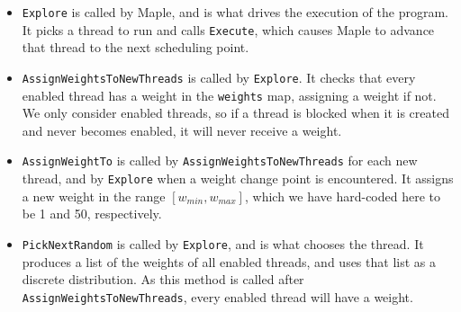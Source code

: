 \begin{itemize}
\item \verb|Explore| is called by Maple, and is what drives the
  execution of the program.  It picks a thread to run and calls
  \verb|Execute|, which causes Maple to advance that thread to the
  next scheduling point.

\item \verb|AssignWeightsToNewThreads| is called by \verb|Explore|.
  It checks that every enabled thread has a weight in the
  \verb|weights| map, assigning a weight if not.  We only consider
  enabled threads, so if a thread is blocked when it is created and
  never becomes enabled, it will never receive a weight.

\item \verb|AssignWeightTo| is called by
  \verb|AssignWeightsToNewThreads| for each new thread, and by
  \verb|Explore| when a weight change point is encountered.  It
  assigns a new weight in the range $[w_{min}, w_{max}]$, which we
  have hard-coded here to be 1 and 50, respectively.

\item \verb|PickNextRandom| is called by \verb|Explore|, and is what
  chooses the thread.  It produces a list of the weights of all
  enabled threads, and uses that list as a discrete distribution.  As
  this method is called after \verb|AssignWeightsToNewThreads|, every
  enabled thread will have a weight.
\end{itemize}
